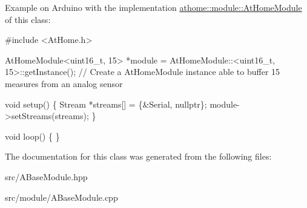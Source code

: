 Example on Arduino with the implementation \mbox{\hyperlink{classathome_1_1module_1_1_at_home_module}{athome\+::module\+::\+At\+Home\+Module}} of this class\+:


\begin{DoxyCode}
\textcolor{preprocessor}{#include <AtHome.h>}

AtHomeModule<uint16\_t, 15> *module = AtHomeModule::<uint16\_t,
15>::getInstance(); \textcolor{comment}{// Create a AtHomeModule instance able to buffer 15}
measures from an analog sensor

\textcolor{keywordtype}{void} setup() \{
  Stream *streams[] = \{&Serial, \textcolor{keyword}{nullptr}\};
  module->setStreams(streams);
\}

\textcolor{keywordtype}{void} loop() \{
\}
\end{DoxyCode}
 

The documentation for this class was generated from the following files\+:\begin{DoxyCompactItemize}
\item 
src/A\+Base\+Module.\+hpp\item 
src/module/A\+Base\+Module.\+cpp\end{DoxyCompactItemize}
